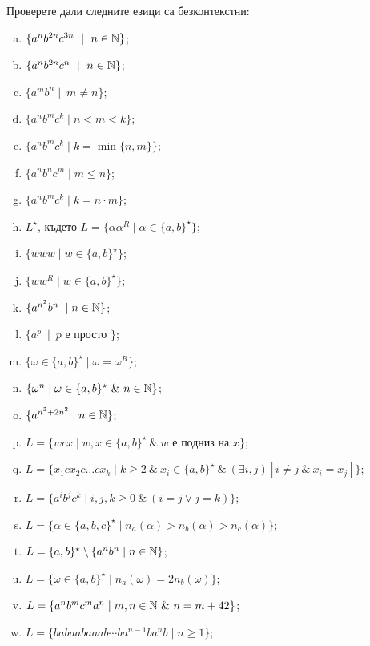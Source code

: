 \begin{problem}
  Проверете дали следните езици са безконтекстни:
  \begin{enumerate}[a)]
  \item
    $\{a^nb^{2n}c^{3n}\ \mid\ n\in\Nat\}$;
  \item
    $\{a^nb^{2n}c^{n}\ \mid\ n\in\Nat\}$;
  \item
    $\{a^mb^n\mid\ m \neq n\}$;
  \item
    $\{a^nb^mc^k\mid n < m < k\}$;
  \item
    $\{a^nb^mc^k\mid k = \min\{n,m\}\}$;
  \item
    $\{a^nb^nc^m\mid m \leq n\}$;
  \item
    $\{a^nb^mc^k\mid k = n\cdot m\}$;
  \item
    $L^\star$, където
    $L = \{\alpha\alpha^R \mid \alpha \in \{a,b\}^\star\}$;
  \item
    $\{www\mid w\in \{a,b\}^\star\}$;
  \item
    $\{ww^R\mid w\in \{a,b\}^\star\}$;
  \item
    $\{a^{n^2}b^n\ \mid n \in \mathbb{N}\}$;
  \item
    $\{a^p\ \mid\ p\mbox{ е просто }\}$;
  \item
    $\{\omega \in \{a,b\}^\star \mid \omega = \omega^R\}$;
  \item
    $\{\omega^n \mid \omega \in \{a,b\}^\star\ \&\ n \in \mathbb{N}\}$;
  \item
    $\{a^{n^3 + 2n^2} \mid n \in \mathbb{N}\}$;
  \item
    $L = \{w c x\mid w,x\in \{a,b\}^\star\ \&\ w\mbox{ е подниз на }x\}$;
  \item
    $L = \{x_1 c x_2 c \dots c x_k\mid k\geq 2\ \&\ x_i\in\{a,b\}^\star\ \&\ (\exists i,j)[i \neq j\ \&\ x_i = x_j]\}$;
  \item
    $L = \{a^ib^jc^k\mid i,j,k\geq 0\ \&\ (i = j \vee j = k)\}$;
  \item
    $L = \{\alpha \in \{a,b,c\}^\star\mid n_a(\alpha) > n_b(\alpha) > n_c(\alpha)\}$;
  \item
    $L = \{a,b\}^\star \setminus \{a^nb^n\mid n\in \mathbb{N}\}$;
  \item
    $L = \{\omega \in \{a,b\}^\star \mid n_a(\omega) = 2n_b(\omega)\}$;
  \item
    $L = \{a^nb^mc^ma^n \mid m,n\in\Nat\ \&\ n = m+42\}$;
  \item
    $L = \{babaabaaab\cdots ba^{n-1}ba^nb \mid n \geq 1\}$;


\end{enumerate}
\end{problem}
